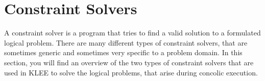 \section{Constraint Solvers}\label{section:contraint_solvers}
A constraint solver is a program that tries to find a valid solution to a formulated logical problem. 
There are many different types of constraint solvers, that are sometimes generic and sometimes very specific to a problem domain.
In this section, you will find an overview of the two types of constraint solvers that are used in KLEE to solve the logical problems, that arise during concolic execution.

